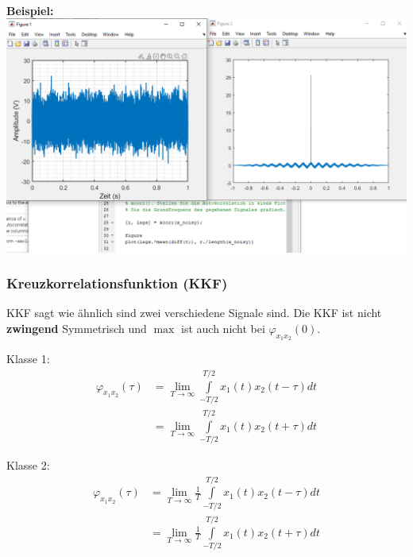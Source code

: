 ~\\

\noindent\textbf{Beispiel:}\\
\includegraphics[width=\linewidth]{Images/akf_example}

\subsubsection{Kreuzkorrelationsfunktion (KKF)}
KKF sagt wie ähnlich sind zwei verschiedene Signale sind. Die KKF ist nicht \textbf{zwingend} Symmetrisch und $\max$ ist auch nicht bei $\varphi_{x_1x_2}(0)$.

Klasse 1:
\begin{align*}
	\varphi_{x_1x_2}(\tau) &= \lim\limits_{T\rightarrow\infty}\int\limits_{-T/2}^{T/2}x_1(t)x_2(t-\tau)dt \\
	&= \lim\limits_{T\rightarrow\infty}\int\limits_{-T/2}^{T/2}x_1(t)x_2(t+\tau)dt
\end{align*}

Klasse 2:
\begin{align*}
	\varphi_{x_1x_2}(\tau) &= \lim\limits_{T\rightarrow\infty}\frac{1}{T}\int\limits_{-T/2}^{T/2}x_1(t)x_2(t-\tau)dt \\
	&= \lim\limits_{T\rightarrow\infty}\frac{1}{T}\int\limits_{-T/2}^{T/2}x_1(t)x_2(t+\tau)dt
\end{align*}

